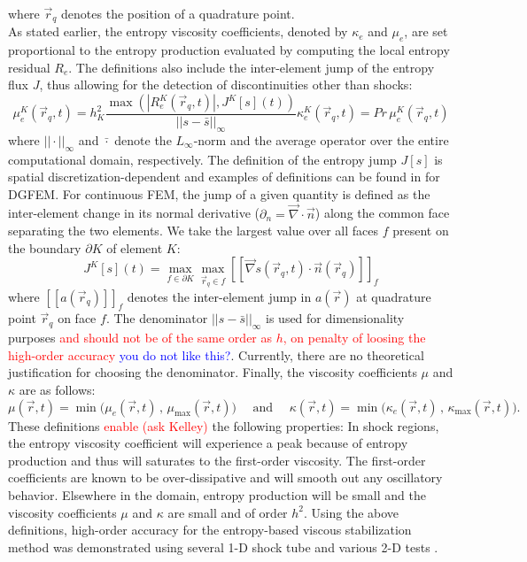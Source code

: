 \documentclass[preprint,10pt]{elsarticle}
\newcommand{\grad}{\vec{\nabla}}
\newcommand{\jmp}[1]{[\![#1]\!]}                     %
\newcommand{\resi}{R_e}
\newcommand{\tcr}[1]{\textcolor{red}{#1}}
\newcommand{\tcb}[1]{\textcolor{blue}{#1}}
\begin{document}
%
where $\vec{r}_q$ denotes the position of a quadrature point.\\
As stated earlier, the entropy viscosity coefficients, denoted by $\kappa_e$ and $\mu_e$, are set proportional to the entropy production evaluated by computing the local entropy residual $\resi$. The definitions also include the inter-element jump of the entropy flux $J$, thus allowing for the detection of discontinuities other than shocks:
%
\begin{subequations}
\label{eq:ent_visc_coeff}
\begin{equation}
\mu^K_e(\vec{r}_q,t) =  h_K^2 \frac{\max\left( | \resi^K(\vec{r}_q,t) |, J^K[s](t) \right)}{|| s - \bar{s} ||_\infty}  
\end{equation}
\begin{equation}
\kappa^K_e(\vec{r}_q,t) = Pr \, \mu^K_e(\vec{r}_q,t)
\end{equation}
\end{subequations}
%
where $|| \cdot ||_\infty$ and $\bar{\cdot}$ denote the $L_\infty$-norm and the average operator over the entire computational domain, respectively. The definition of the entropy jump $J[s]$ is spatial discretization-dependent and examples of definitions can be found in \cite{valentin} for DGFEM. For continuous FEM, the jump of a given quantity is defined as the inter-element change in its normal derivative ($\partial_n = \grad \cdot \vec{n}$) along the common face separating the two elements. We take the largest value over all faces $f$ present on the boundary $\partial K$ of element $K$:
%
\begin{equation}
\label{eq:jump_CFEM}
J^K[s](t) = \max_{f\in\partial K}  \max_{\vec{r}_q \in f} \jmp{\grad s(\vec{r}_q,t) \cdot \vec{n}(\vec{r}_q) }_f
\end{equation}
%
where $\jmp{a(\vec{r}_q)}_f$ denotes the inter-element jump in $a(\vec{r})$ at quadrature point $\vec{r}_q$ on face $f$.  
The denominator $|| s - \bar{s} ||_\infty$ is used for dimensionality purposes \tcr{and should not be of the same order as $h$, on penalty of loosing the high-order accuracy} \tcb{you do not like this?}. Currently, there are no theoretical justification for choosing the denominator. 
Finally, the viscosity coefficients $\mu$ and $\kappa$ are as follows:
%
\begin{equation}
\mu(\vec{r},t)    = \min\Big( \mu_e(\vec{r},t)   \,,\, \mu_{\max}(\vec{r},t)    \Big) 
\quad \text{ and } \quad 
\kappa(\vec{r},t) = \min\Big( \kappa_e(\vec{r},t)\,,\, \kappa_{\max}(\vec{r},t) \Big).
\end{equation}
%
These definitions \tcr{enable (ask Kelley)} the following properties: 
In shock regions, the entropy viscosity coefficient will experience a peak because of entropy production and thus will saturates to the first-order viscosity. The first-order coefficients are known to be over-dissipative and will smooth out any oscillatory behavior. Elsewhere in the domain, entropy production will be small and the viscosity coefficients $\mu$ and $\kappa$ are small and of order $h^2$.
Using the above definitions, high-order accuracy for the entropy-based viscous stabilization method was demonstrated using several 1-D shock tube and various 2-D tests \cite{jlg1, jlg2, valentin}.
\end{document}

